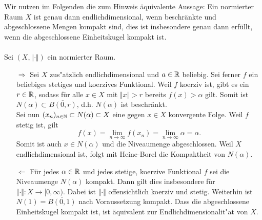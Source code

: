 
Wir nutzen im Folgenden die zum Hinweis äquivalente Aussage: Ein normierter Raum $X$ ist genau dann endlichdimensional, wenn beschränkte und abgeschlossene Mengen kompakt sind,
dies ist insbesondere genau dann erfüllt, wenn die abgeschlossene Einheitskugel kompakt ist.
\\\\
Sei $(X,\Vert\cdot\Vert)$ ein normierter Raum.\\
\begin{itemize}
 \item [$\Rightarrow$] Sei $X$ zus"atzlich endlichdimensional und $a\in\mathbb{R}$ beliebig.
 Sei ferner $f$ ein beliebiges stetiges und koerzives Funktional.
 Weil $f$ koerziv ist, gibt es ein 
 $r\in\mathbb{R}$, sodass für alle $x\in X$ mit $\Vert x\Vert>r$ bereits $f(x)>\alpha$ gilt. Somit ist $N(\alpha) \subset \overline{B(0,r)}$,
 d.h. $N(\alpha)$ ist beschränkt.\\
 Sei nun $(x_n)_{n\in\mathbb{N}}\subset N(\alpha)\subset X$ eine gegen $x\in X$ konvergente Folge. Weil $f$ stetig ist, gilt
 \begin{displaymath}
  f(x)=\lim_{n\to\infty} f(x_n) =\lim_{n\to\infty} \alpha =\alpha.
 \end{displaymath}
Somit ist auch $x\in N(\alpha)$ und die Niveaumenge abgeschlossen. Weil $X$ endlichdimensional ist, folgt mit Heine-Borel die Kompaktheit von $N(\alpha)$.\\
\item [$\Leftarrow$] Für jedes $\alpha\in \mathbb{R}$ und jedes stetige, koerzive Funktional $f$ sei die Niveaumenge $N(\alpha)$ kompakt. Dann gilt
dies insbesondere für $\Vert\cdot\Vert: X\to [0,\infty)$.
Dabei ist $\Vert\cdot\Vert$ offensichtlich koerziv und stetig. Weiterhin ist $N(1)=\overline{B(0,1)}$ nach Voraussetzung kompakt.
Dass die abgeschlossene Einheitskugel kompakt ist, ist äquivalent zur Endlichdimensionalit"at von $X$.
\end{itemize}
